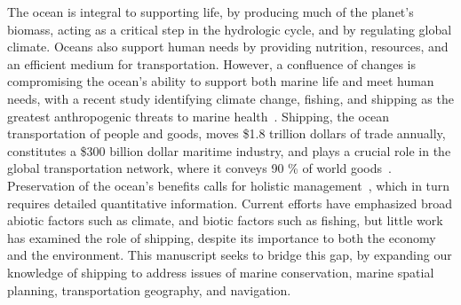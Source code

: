 


The ocean is integral to supporting life, by producing much of the planet's biomass, acting as a critical step in the hydrologic cycle, and by regulating global climate. Oceans also support human needs by providing nutrition, resources, and an efficient medium for transportation. However, a confluence of changes is compromising the ocean's ability to support both marine life and meet human needs, with a recent study identifying climate change, fishing, and shipping as the greatest anthropogenic threats to marine health~\citep{Halpern2008}.  Shipping, the ocean transportation of people and goods, moves \$1.8 trillion dollars of trade annually, constitutes a \$300 billion dollar maritime industry, and plays a crucial role in the global transportation network, where it conveys 90 \% of world goods~\citep{oced2010,Rodrigue2009}. Preservation of the ocean's benefits calls for holistic management~\citep{Lubchenco2010}, which in turn requires detailed quantitative information. Current efforts have emphasized broad abiotic factors such as climate, and biotic factors such as fishing, but little work has examined the role of shipping, despite its importance to both the economy and the environment. This manuscript seeks to bridge this gap, by expanding our knowledge of shipping to address issues of marine conservation, marine spatial planning, transportation geography, and navigation.


